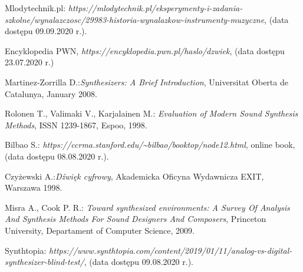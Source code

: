 \documentclass[nostrict]{szablonPG}
\begin{document}



	\setcounter{page}{3}
	\let\cleardoublepage\clearpage
	
	
	
	
	
	
	
	
	
	
	
%	
	
	
%	
%	
	

	\listoffigures      %
	\listoftables

	\begin{thebibliography}{20}                      %
		\small              %
		Mlodytechnik.pl: \emph{https://mlodytechnik.pl/eksperymenty-i-zadania-szkolne/wynalazczosc/29983-historia-wynalazkow-instrumenty-muzyczne}, (data dostępu 09.09.2020 r.).
		
		Encyklopedia PWN, \emph{https://encyklopedia.pwn.pl/haslo/dzwiek}, (data dostępu 23.07.2020 r.)
		
		Martinez-Zorrilla D.:\emph{Synthesizers: A Brief Introduction}, Universitat Oberta de Catalunya, January 2008.

		Rolonen T., Valimaki V., Karjalainen M.: \emph{Evaluation of Modern Sound Synthesis Methods}, ISSN 1239-1867, Espoo, 1998.

		Bilbao S.: \emph{https://ccrma.stanford.edu/\textasciitilde bilbao/booktop/node12.html}, online book, (data dostępu 08.08.2020 r.).
		
		Czyżewski A.:\emph{Dźwięk cyfrowy}, Akademicka Oficyna Wydawnicza EXIT, Warszawa 1998.
		 
		Misra A., Cook P. R.: \emph{Toward synthesized environments: A Survey Of Analysis And Synthesis Methods For Sound Designers And Composers}, Princeton University, Departament of Computer Science, 2009.
		
		Synthtopia: \emph{https://www.synthtopia.com/content/2019/01/11/analog-vs-digital-synthesizer-blind-test/}, (data dostępu 09.08.2020 r.).


\end{thebibliography}
\end{document}
